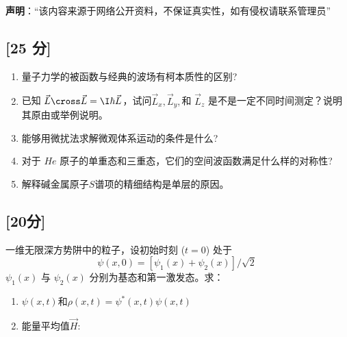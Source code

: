 
\textbf{声明}：“该内容来源于网络公开资料，不保证真实性，如有侵权请联系管理员”

\subsection{[25 分]}
\begin{enumerate}
\item 量子力学的被函数与经典的波场有柯本质性的区别?
\item 已知 $\vec L \cross \vec L = \I \hbar \vec L$，试问$\vec L_x, \vec L_y,$和 $\vec L_z$ 是不是一定不同时间测定？说明其原由或举例说明。
\item 能够用微扰法求解微观体系运动的条件是什么?
\item 对于 $He$ 原子的单重态和三重态，它们的空间波函数满足什么样的对称性?
\item 解释碱金属原子$S$谱项的精细结构是单层的原因。
\end{enumerate}
\subsection{[20分]}
一维无限深方势阱中的粒子，设初始时刻 ($t = 0$) 处于
\[
\psi(x, 0) = [\psi_1(x) + \psi_2(x)]/\sqrt{2}~
\]
$\psi_1(x)$ 与 $\psi_2(x)$ 分别为基态和第一激发态。求：
\begin{enumerate}
\item $\psi(x, t)$和$\rho(x,t) = \psi^*(x,t)\psi(x,t)$
\item 能量平均值$\vec H$:
\end{enumerate}
